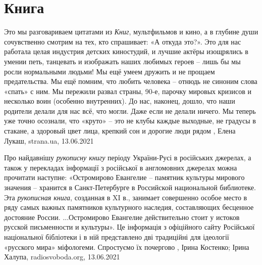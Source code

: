  
 
 
 
 
\chapter{Книга}
\label{sec:slova.kniga}

Это мы разговариваем цитатами из \emph{Книг}, мультфильмов и кино, а в глубине души
сочувственно смотрим на тех, кто спрашивает: «А откуда это?».  Это для нас
работала целая индустрия детских киностудий, и лучшие актёры изощрялись в
умении петь, танцевать и изображать наших любимых героев – лишь бы мы росли
нормальными людьми!  Мы ещё умеем дружить и не прощаем предательства.  Мы ещё
помним, что любить человека – отнюдь не синоним слова «спать» с ним.  Мы
пережили развал страны, 90-е, парочку мировых кризисов и несколько воин
(особенно внутренних).  До нас, наконец, дошло, что наши родители делали для
нас всё, что могли. Даже если не делали ничего.  Мы теперь уже точно осознали,
что «круто» – это не клубы каждые выходные, не градусы в стакане, а здоровый
цвет лица, крепкий сон и дорогие люди рядом
, 
Елена Лукаш, strana.ua, 13.06.2021


Про найдавнішу \emph{рукописну книгу} періоду України-Русі в російських
джерелах, а також у перекладах інформації з російської в англомовних джерелах
можна прочитати наступне: «Остромирово Евангелие – памятник культуры мирового
значения – хранится в Санкт-Петербурге в Российской национальной библиотеке.
Эта \emph{рукописная книга}, созданная в XI в., занимает совершенно особое
место в ряду самых важных памятников культурного наследия, составляющих
бесценное достояние России.  ...Остромирово Евангелие действительно стоит у
истоков русской письменности и культуры». Це інформація з офіційного сайту
Російської національної бібліотеки і в ній представлено дві традиційні для
ідеології «русского мира» міфологеми. Спростуємо їх почергово
,
Ірина Костенко; Ірина Халупа, radiosvoboda.org, 13.06.2021

